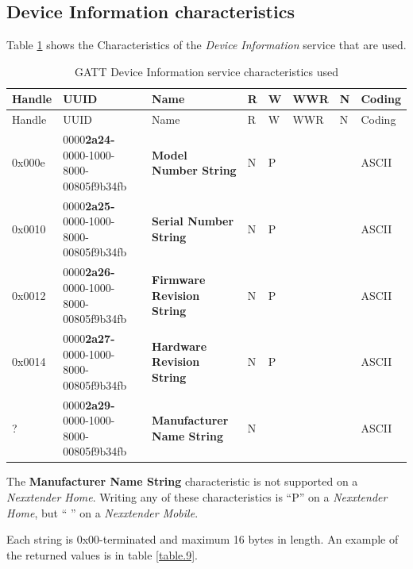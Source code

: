 \documentclass[a4paper]{article}
\begin{document}
\subsection{Device Information characteristics}
\label{device_information_characteristics}

Table \ref{table.8} shows the Characteristics of the \emph{Device Information} service that are used.

\begin{longtable}[]{p{1cm} p{5.7cm} p{4.5cm} p{0.3cm} p{0.3cm} p{0.7cm} p{0.3cm}  p{0.8cm}}
	\caption{GATT Device Information service characteristics used}
	\label{table.8}
	\tabularnewline
	\toprule\noalign{}
	Handle & UUID & Name & R & W & WWR & N & Coding \\
	\midrule\noalign{}
	\endfirsthead
	\toprule\noalign{}
	Handle & UUID & Name & R & W & WWR & N & Coding \\
	\midrule\noalign{}
	\endhead
	\bottomrule\noalign{}
	\endlastfoot
	0x000e & \small 0000\textbf{2a24-}0000-1000-8000-00805f9b34fb & \textbf{Model
	Number String} & N & P & & & ASCII \\
	0x0010 & \small 0000\textbf{2a25-}0000-1000-8000-00805f9b34fb & \textbf{Serial
	Number String} & N & P & & & ASCII \\
	0x0012 & \small 0000\textbf{2a26-}0000-1000-8000-00805f9b34fb &
	\textbf{Firmware Revision String} & N & P & & & ASCII \\
	0x0014 & \small 0000\textbf{2a27-}0000-1000-8000-00805f9b34fb &
	\textbf{Hardware Revision String} & N & P & & & ASCII \\
	? & \small 0000\textbf{2a29-}0000-1000-8000-00805f9b34fb &
	\textbf{Manufacturer Name String} & N &  & & & ASCII \\

\end{longtable}

The \textbf{Manufacturer Name String} characteristic is not supported on a \emph{Nexxtender Home}.
Writing any of these characteristics is ``P'' on a \emph{Nexxtender Home}, but ``  '' on a \emph{Nexxtender Mobile}.

Each string is 0x00-terminated and maximum 16 bytes in length. 
An example of the returned values is in table \ref{table.9}.
\end{document}
